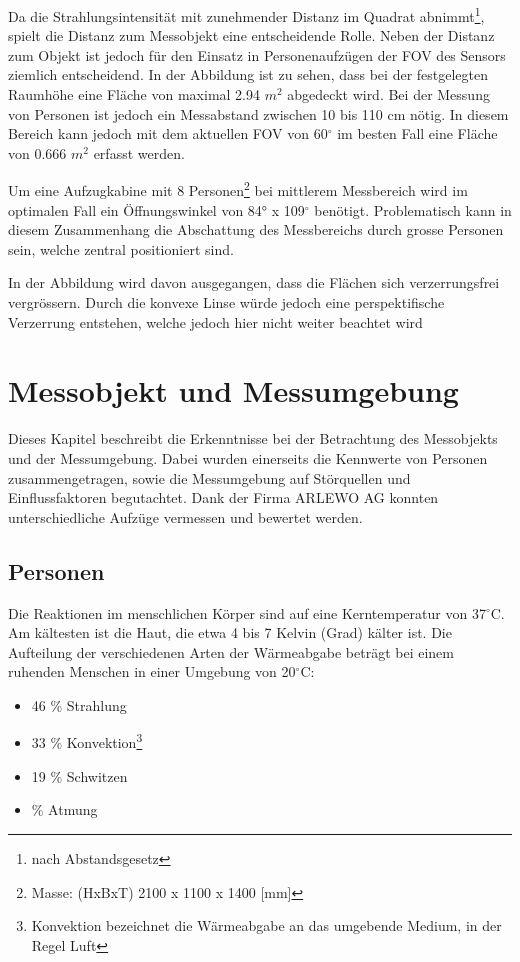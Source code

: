 Da die Strahlungsintensität mit zunehmender Distanz im Quadrat abnimmt\footnote[6]{nach Abstandsgesetz}, spielt die Distanz zum Messobjekt eine entscheidende Rolle. Neben der Distanz zum Objekt ist jedoch für den Einsatz in Personenaufzügen der \ac{FOV} des Sensors ziemlich entscheidend. In der Abbildung ist zu sehen, dass bei der festgelegten Raumhöhe eine Fläche von maximal 2.94 $m^2$ abgedeckt wird. Bei der Messung von Personen ist jedoch ein Messabstand zwischen 10 bis 110 cm nötig. In diesem Bereich kann jedoch mit dem aktuellen \ac{FOV} von 60$^\circ$ im besten Fall eine Fläche von 0.666 $m^2$ erfasst werden.

Um eine Aufzugkabine mit 8 Personen\footnote[7]{Masse: (HxBxT) 2100 x 1100 x 1400 [mm]} bei mittlerem Messbereich wird im optimalen Fall ein Öffnungswinkel von 84° x 109$^\circ$ benötigt. Problematisch kann in diesem Zusammenhang die Abschattung des Messbereichs durch grosse Personen sein, welche zentral positioniert sind.

In der Abbildung wird davon ausgegangen, dass die Flächen sich verzerrungsfrei vergrössern. Durch die konvexe Linse würde jedoch eine perspektifische Verzerrung entstehen, welche jedoch hier nicht weiter beachtet wird


\section{Messobjekt und Messumgebung}
\label{sec:Messobjekt}
Dieses Kapitel beschreibt die Erkenntnisse bei der Betrachtung des Messobjekts und der Messumgebung. Dabei wurden einerseits die Kennwerte von Personen zusammengetragen, sowie die Messumgebung auf Störquellen und Einflussfaktoren begutachtet. Dank der Firma ARLEWO AG konnten unterschiedliche Aufzüge vermessen und bewertet werden. 

\subsection{Personen}
\label{subsec:Personen}
Die Reaktionen im menschlichen Körper sind auf eine Kerntemperatur von 37$^\circ$C. Am kältesten ist die Haut, die etwa 4 bis 7 Kelvin (Grad) kälter ist. Die Aufteilung der verschiedenen Arten der Wärmeabgabe beträgt bei einem ruhenden Menschen in einer Umgebung von 20$^\circ$C:
\begin{itemize}
	\item 46 \% Strahlung
	\item 33 \% Konvektion\footnote[8]{Konvektion bezeichnet die Wärmeabgabe an
		das umgebende Medium, in der Regel Luft}
	\item 19 \% Schwitzen
	\item {} \% Atmung
\end{itemize}

